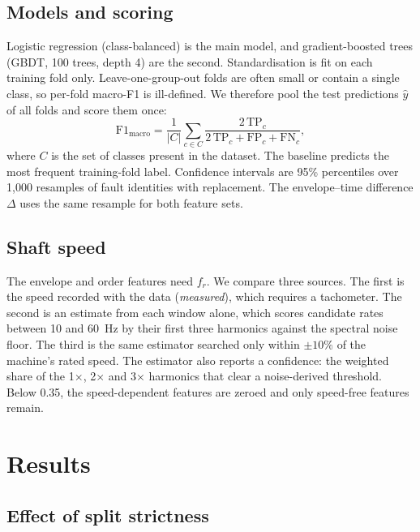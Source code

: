 \documentclass[conference,letterpaper]{IEEEtran}
\begin{document}
\subsection{Models and scoring}

Logistic regression (class-balanced) is the main model, and gradient-boosted trees (GBDT, 100 trees, depth 4) are
the second. Standardisation is fit on each training fold only. Leave-one-group-out folds are often small or
contain a single class, so per-fold macro-F1 is ill-defined. We therefore pool the test predictions $\hat y$ of
all folds and score them once:
\begin{equation}
\mathrm{F1}_{\mathrm{macro}} = \frac{1}{|C|}\sum_{c\in C}
\frac{2\,\mathrm{TP}_c}{2\,\mathrm{TP}_c+\mathrm{FP}_c+\mathrm{FN}_c},
\label{eq:f1}
\end{equation}
where $C$ is the set of classes present in the dataset. The baseline predicts the most frequent training-fold
label. Confidence intervals are 95\% percentiles over 1{,}000 resamples of fault identities with replacement. The
envelope--time difference $\Delta$ uses the same resample for both feature sets.

\subsection{Shaft speed}

The envelope and order features need $f_r$. We compare three sources. The first is the speed recorded with the
data (\emph{measured}), which requires a tachometer. The second is an estimate from each window alone, which
scores candidate rates between 10 and 60~Hz by their first three harmonics against the spectral noise floor. The
third is the same estimator searched only within $\pm10\%$ of the machine's rated speed. The estimator also
reports a confidence: the weighted share of the 1$\times$, 2$\times$ and 3$\times$ harmonics that clear a
noise-derived threshold. Below 0.35, the speed-dependent features are zeroed and only speed-free features remain.

\section{Results}

\subsection{Effect of split strictness}
\end{document}
